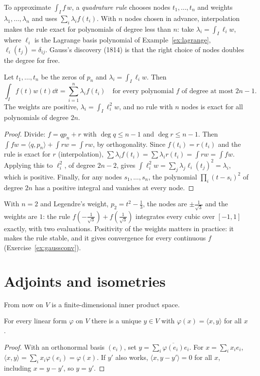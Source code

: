 To approximate $\int_If\,w$, a \emph{quadrature rule} chooses nodes $t_1,\dots,t_n$ and weights $\lambda_1,\dots,\lambda_n$
and uses $\sum_i\lambda_if(t_i)$. With $n$ nodes chosen in advance, interpolation makes the rule exact for polynomials
of degree less than $n$: take $\lambda_i=\int_I\ell_iw$, where $\ell_i$ is the Lagrange basis polynomial of
Example~\ref{ex:lagrange}, $\ell_i(t_j)=\delta_{ij}$. Gauss's discovery (1814) is that the right choice of nodes doubles
the degree for free.

\begin{theorem}\label{thm:gaussquad}
Let $t_1,\dots,t_n$ be the zeros of $p_n$ and $\lambda_i=\int_I\ell_iw$. Then
\[
\int_If(t)w(t)\dd t=\sum_{i=1}^n\lambda_if(t_i)\quad\text{for every polynomial $f$ of degree at most $2n-1$.}
\]
The weights are positive, $\lambda_i=\int_I\ell_i^2w$, and no rule with $n$ nodes is exact for all polynomials of degree
$2n$.
\end{theorem}
\begin{proof}
Divide: $f=qp_n+r$ with $\deg q\le n-1$ and $\deg r\le n-1$. Then $\int fw=\langle q,p_n\rangle+\int rw=\int rw$, by
orthogonality. Since $f(t_i)=r(t_i)$ and the rule is exact for $r$ (interpolation), $\sum\lambda_if(t_i)=\sum\lambda_ir(t_i)
=\int rw=\int fw$. Applying this to $\ell_i^2$, of degree $2n-2$, gives $\int\ell_i^2w=\sum_j\lambda_j\ell_i(t_j)^2=\lambda_i$,
which is positive. Finally, for any nodes $s_1,\dots,s_n$, the polynomial $\prod_i(t-s_i)^2$ of degree $2n$ has a positive
integral and vanishes at every node.
\end{proof}

With $n=2$ and Legendre's weight, $p_2=t^2-\frac13$, the nodes are $\pm\frac1{\sqrt3}$ and the weights are $1$: the rule
$f(-\frac1{\sqrt3})+f(\frac1{\sqrt3})$ integrates every cubic over $[-1,1]$ exactly, with two evaluations. Positivity of the
weights matters in practice: it makes the rule stable, and it gives convergence for every continuous $f$ (Exercise~\ref{ex:gaussconv}).

\section{Adjoints and isometries}\label{sec:adjoint}

From now on $V$ is a finite-dimensional inner product space.

\begin{theorem}\label{thm:riesz}
For every linear form $\varphi$ on $V$ there is a unique $y\in V$ with $\varphi(x)=\langle x,y\rangle$ for all $x$.
\end{theorem}
\begin{proof}
With an orthonormal basis $(e_i)$, set $y=\sum_i\overline{\varphi(e_i)}e_i$. For $x=\sum_ix_ie_i$,
$\langle x,y\rangle=\sum_ix_i\varphi(e_i)=\varphi(x)$. If $y'$ also works, $\langle x,y-y'\rangle=0$ for all $x$, including
$x=y-y'$, so $y=y'$.
\end{proof}

